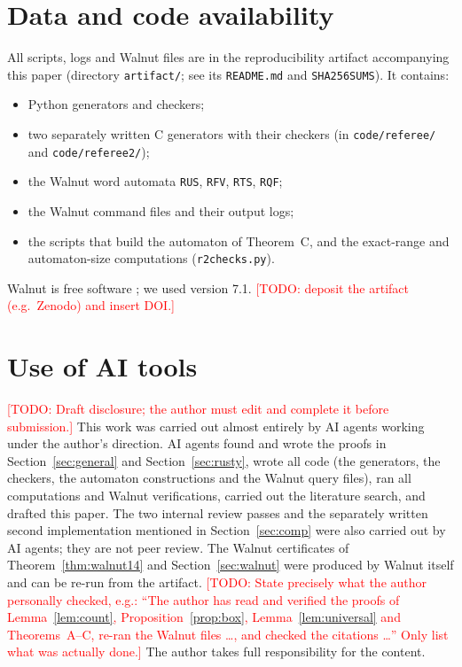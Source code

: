 \documentclass[11pt]{amsart}
\theoremstyle{definition}
\theoremstyle{remark}
\newcommand{\todo}[1]{\textcolor{red}{[TODO: #1]}}
\begin{document}
\section{Data and code availability}
All scripts, logs and Walnut files are in the reproducibility artifact accompanying this paper (directory \texttt{artifact/}; see its \texttt{README.md} and \texttt{SHA256SUMS}). It contains:
\begin{itemize}
\item Python generators and checkers;
\item two separately written C generators with their checkers (in \texttt{code/referee/} and \texttt{code/referee2/});
\item the Walnut word automata \texttt{RUS}, \texttt{RFV}, \texttt{RTS}, \texttt{RQF};
\item the Walnut command files and their output logs;
\item the scripts that build the automaton of Theorem~C, and the exact-range and automaton-size computations (\texttt{r2checks.py}).
\end{itemize}
Walnut is free software \cite{Mousavi}; we used version 7.1. \todo{deposit the artifact (e.g.\ Zenodo) and insert DOI.}

\section*{Use of AI tools}
\todo{Draft disclosure; the author must edit and complete it before submission.}
This work was carried out almost entirely by AI agents working under the author's direction. AI agents found and wrote the proofs in Section~\ref{sec:general} and Section~\ref{sec:rusty}, wrote all code (the generators, the checkers, the automaton constructions and the Walnut query files), ran all computations and Walnut verifications, carried out the literature search, and drafted this paper. The two internal review passes and the separately written second implementation mentioned in Section~\ref{sec:comp} were also carried out by AI agents; they are not peer review. The Walnut certificates of Theorem~\ref{thm:walnut14} and Section~\ref{sec:walnut} were produced by Walnut itself and can be re-run from the artifact. \todo{State precisely what the author personally checked, e.g.: ``The author has read and verified the proofs of Lemma~\ref{lem:count}, Proposition~\ref{prop:box}, Lemma~\ref{lem:universal} and Theorems~A--C, re-ran the Walnut files \dots, and checked the citations \dots'' Only list what was actually done.} The author takes full responsibility for the content.
\end{document}
